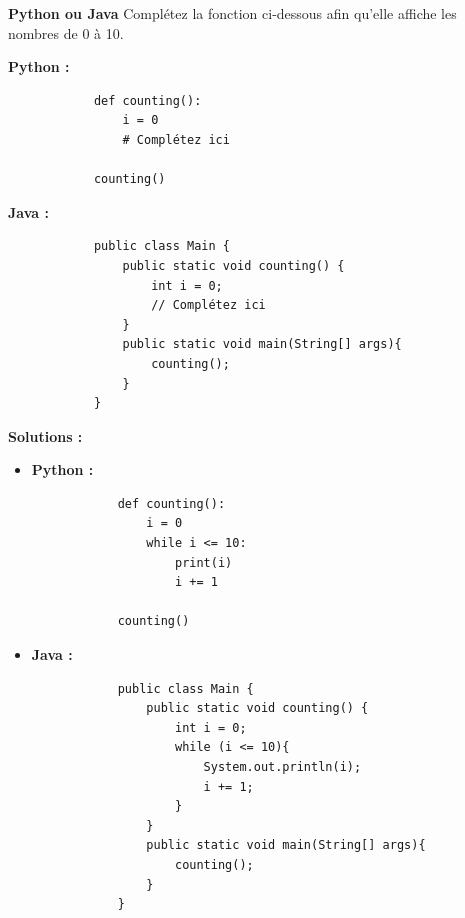 \begin{Exercice}[5 minutes] \textbf{Python ou Java}
    Complétez la fonction ci-dessous afin qu'elle affiche les nombres de 0 à 10.
    
    \textbf{Python :}
        \begin{verbatim}
            def counting():
                i = 0
                # Complétez ici
            
            counting()
        \end{verbatim}
    
    \textbf{Java :}
        \begin{verbatim}
            public class Main {
                public static void counting() {
                    int i = 0;
                    // Complétez ici
                }
                public static void main(String[] args){
                    counting();
                }
            }
        \end{verbatim}
    
    \textbf{Solutions :}
    \begin{itemize}
        \item \textbf{Python :}
        \begin{verbatim}
            def counting():
                i = 0
                while i <= 10:
                    print(i)
                    i += 1
            
            counting()
        \end{verbatim}
        
        \item \textbf{Java :}
        \begin{verbatim}
            public class Main {
                public static void counting() {
                    int i = 0;
                    while (i <= 10){
                        System.out.println(i);
                        i += 1;
                    }
                }
                public static void main(String[] args){
                    counting();
                }
            }
        \end{verbatim}
    \end{itemize}

\end{Exercice}

\newpage

